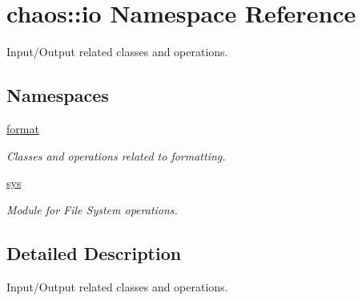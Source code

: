 \hypertarget{namespacechaos_1_1io}{\section{chaos\-:\-:io Namespace Reference}
\label{namespacechaos_1_1io}
}


Input/\-Output related classes and operations.  


\subsection*{Namespaces}
\begin{DoxyCompactItemize}
\item 
\hyperlink{namespacechaos_1_1io_1_1format}{format}
\begin{DoxyCompactList}\small\item\em Classes and operations related to formatting. \end{DoxyCompactList}\item 
\hyperlink{namespacechaos_1_1io_1_1sys}{sys}
\begin{DoxyCompactList}\small\item\em Module for File System operations. \end{DoxyCompactList}\end{DoxyCompactItemize}


\subsection{Detailed Description}
Input/\-Output related classes and operations. 